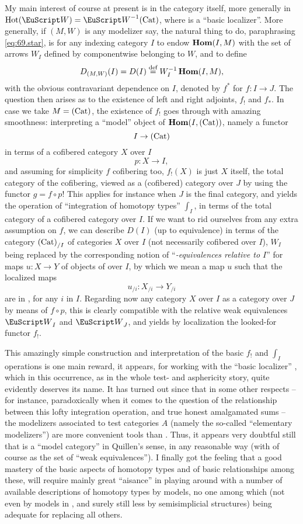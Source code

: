 My main interest of course at present is in the category \Hot{}
itself, more generally in $\HotOf(\scrW)=\scrW^{-1}\Cat$, where
\scrW{} is a ``basic localizer''. More generally, if $(M,W)$ is any
modelizer say, the natural thing to do, paraphrasing
\eqref{eq:69.star}, is for any indexing category $I$ to endow
$\operatorname{\mathbf{Hom}}(I,M)$ with the set of arrows $W_I$ defined by componentwise
belonging to $W$, and to define
\[ D_{(M,W)}(I) = D(I) \overset{\textup{def}}{=} W_I^{-1}\operatorname{\mathbf{Hom}}(I,M),\]
with the obvious contravariant dependence on $I$, denoted by $f^*$ for
$f:I\to J$. The question then arises as to the existence of left and
right adjoints, $f_!$ and $f_*$. In case we take $M={(\mathrm{Cat})}$, the
existence of $f_!$ goes through with amazing smoothness: interpreting
a ``model'' object of $\operatorname{\mathbf{Hom}}(I,{(\mathrm{Cat})})$, namely a functor
\[I\to {\ensuremath{(\mathrm{Cat})}}\]
in terms of a cofibered category $X$ over $I$
\[p: X\to I,\]
and assuming for simplicity $f$ cofibering too, $f_!(X)$ is just $X$
itself, the total category of the cofibering, viewed as a (cofibered)
category over $J$ by using the functor $g=f\circ p$! This applies for
instance when $J$ is the final category, and yields the operation of
``integration of homotopy types'' $\int_I$, in terms of the total
category of a cofibered category over $I$. If we want to rid ourselves
from any extra assumption on $f$, we can describe $D(I)$ (up to
equivalence) in terms of the category ${(\mathrm{Cat})}_{/I}$ of categories $X$
over $I$ (not necessarily cofibered over $I$), $W_I$ being replaced by
the corresponding notion of ``\emph{\scrW-equivalences relative to
  $I$}'' for maps $u:X\to Y$ of objects of \Cat{} over $I$, by which
we mean a map $u$ such that the localized maps
\[u_{/i}: X_{/i} \to Y_{/i}\]
are in \scrW, for any $i$ in $I$. Regarding now any category $X$ over
$I$ as a category over $J$ by means of $f\circ p$, this is clearly
compatible with the relative weak equivalences $\scrW_I$ and
$\scrW_J$, and yields by localization the looked-for functor $f_!$.

This amazingly simple construction and interpretation of the basic
$f_!$ and $\int_I$ operations is one main reward, it appears, for
working with the ``basic localizer'' \Cat, which in this occurrence,
as in the whole test- and asphericity story, quite evidently deserves
its name. It has turned out since that in some other respects -- for
instance, paradoxically when it comes to the question of the
relationship between this lofty integration operation, and true honest
amalgamated sums -- the modelizers \Ahat{} associated to test
categories $A$ (namely the so-called ``elementary modelizers'') are
more convenient tools than \Cat. Thus, it appears very doubtful still
that \Cat{} is a ``model category'' in Quillen's sense, in any
reasonable way (with \scrW{} of course as the set of ``weak
equivalences''). I finally got the feeling that a good mastery of the
basic aspects of homotopy types and of basic relationships among
these, will require mainly great ``aisance'' in playing around with a
number of available descriptions of homotopy types by models, no one
among which (not even by models in \Cat, and surely still less by
semisimplicial structures) being adequate for replacing all others.

